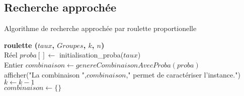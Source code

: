 \documentclass{beamer}
\begin{document}
\subsection{Recherche approchée}
\begin{frame}{Algorithme de recherche approchée par roulette proportionelle}
	\begin{algorithm}
 	\scriptsize
	\textbf{roulette ($taux$, $Groupes$, $k$, $n$)}\\
	Réel $proba[] \leftarrow$ initialisation\_proba($taux$)\\
	\pause
	{	
		\pause
		Entier $combinaison \leftarrow genereCombinaisonAvecProba(proba)$\\
		
		\pause
		{
			afficher("La combinaison ",$combinaison$," permet de caractériser l'instance.")\\
			$k \leftarrow k-1$\\
			$combinaison \leftarrow \{\}$		
		}
	}
	\label{algoRoulette}
\end{algorithm}
\end{frame}
\end{document}
